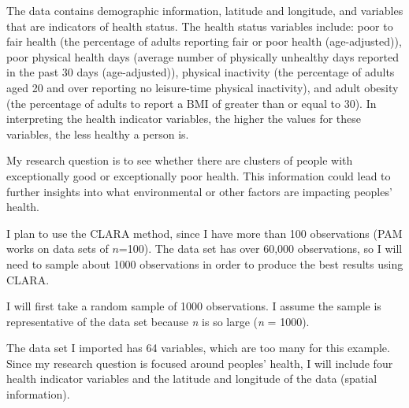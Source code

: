 \documentclass[12pt,twoside]{amherstthesis}
\begin{document}
  The data contains demographic information, latitude and longitude, and
  variables that are indicators of health status. The health status
  variables include: poor to fair health (the percentage of adults
  reporting fair or poor health (age-adjusted)), poor physical health days
  (average number of physically unhealthy days reported in the past 30
  days (age-adjusted)), physical inactivity (the percentage of adults aged
  20 and over reporting no leisure-time physical inactivity), and adult
  obesity (the percentage of adults to report a BMI of greater than or
  equal to 30). In interpreting the health indicator variables, the higher
  the values for these variables, the less healthy a person is.
  
  My research question is to see whether there are clusters of people with
  exceptionally good or exceptionally poor health. This information could
  lead to further insights into what environmental or other factors are
  impacting peoples' health.
  
  I plan to use the CLARA method, since I have more than 100 observations
  (PAM works on data sets of \(n\)=100). The data set has over 60,000
  observations, so I will need to sample about 1000 observations in order
  to produce the best results using CLARA.
  
  I will first take a random sample of 1000 observations. I assume the
  sample is representative of the data set because \emph{n} is so large
  (\emph{n} = 1000).
  
  \begin{Shaded}
  \begin{Highlighting}[]
  \NormalTok{(}\NormalTok{)}
  \StringTok{ }\NormalTok{data_subset[}\NormalTok{(}\OperatorTok{:}\NormalTok{,}
     \NormalTok{),]}
  \end{Highlighting}
  \end{Shaded}
  
  The data set I imported has 64 variables, which are too many for this
  example. Since my research question is focused around peoples' health, I
  will include four health indicator variables and the latitude and
  longitude of the data (spatial information).
  
  \begin{Shaded}
  \begin{Highlighting}[]
  \StringTok{ }\NormalTok{(}\NormalTok{, }\NormalTok{, }\NormalTok{, }
              \NormalTok{, }\NormalTok{, }\NormalTok{)}
  \StringTok{ }
  \StringTok{ }
  \end{Highlighting}
  \end{Shaded}
  
\end{document}
